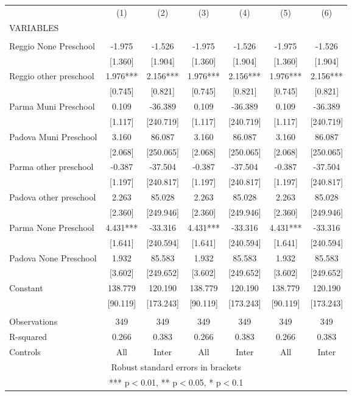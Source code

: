 \begin{tabular}{lcccccc} \hline
 & (1) & (2) & (3) & (4) & (5) & (6) \\
VARIABLES &  &  &  &  &  &  \\ \hline
 &  &  &  &  &  &  \\
Reggio None Preschool & -1.975 & -1.526 & -1.975 & -1.526 & -1.975 & -1.526 \\
 & [1.360] & [1.904] & [1.360] & [1.904] & [1.360] & [1.904] \\
Reggio other preschool & 1.976*** & 2.156*** & 1.976*** & 2.156*** & 1.976*** & 2.156*** \\
 & [0.745] & [0.821] & [0.745] & [0.821] & [0.745] & [0.821] \\
Parma Muni Preschool & 0.109 & -36.389 & 0.109 & -36.389 & 0.109 & -36.389 \\
 & [1.117] & [240.719] & [1.117] & [240.719] & [1.117] & [240.719] \\
Padova Muni Preschool & 3.160 & 86.087 & 3.160 & 86.087 & 3.160 & 86.087 \\
 & [2.068] & [250.065] & [2.068] & [250.065] & [2.068] & [250.065] \\
Parma other preschool & -0.387 & -37.504 & -0.387 & -37.504 & -0.387 & -37.504 \\
 & [1.197] & [240.817] & [1.197] & [240.817] & [1.197] & [240.817] \\
Padova other preschool & 2.263 & 85.028 & 2.263 & 85.028 & 2.263 & 85.028 \\
 & [2.360] & [249.946] & [2.360] & [249.946] & [2.360] & [249.946] \\
Parma None Preschool & 4.431*** & -33.316 & 4.431*** & -33.316 & 4.431*** & -33.316 \\
 & [1.641] & [240.594] & [1.641] & [240.594] & [1.641] & [240.594] \\
Padova None Preschool & 1.932 & 85.583 & 1.932 & 85.583 & 1.932 & 85.583 \\
 & [3.602] & [249.652] & [3.602] & [249.652] & [3.602] & [249.652] \\
Constant & 138.779 & 120.190 & 138.779 & 120.190 & 138.779 & 120.190 \\
 & [90.119] & [173.243] & [90.119] & [173.243] & [90.119] & [173.243] \\
 &  &  &  &  &  &  \\
Observations & 349 & 349 & 349 & 349 & 349 & 349 \\
R-squared & 0.266 & 0.383 & 0.266 & 0.383 & 0.266 & 0.383 \\
 Controls & All & Inter & All & Inter & All & Inter \\ \hline
\multicolumn{7}{c}{ Robust standard errors in brackets} \\
\multicolumn{7}{c}{ *** p$<$0.01, ** p$<$0.05, * p$<$0.1} \\
\end{tabular}
